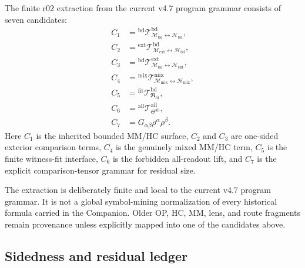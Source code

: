 \begin{definition}
\label{def:v470-r02-extracted-candidate-family}
The finite r02 extraction from the current v4.7 program grammar consists of
seven candidates:
\[
\begin{array}{ll}
C_1 &={}^{\mathrm{bd}}\mathcal T_{\mathcal M_{\mathrm{bd}}\leftrightarrow
\mathcal H_{\mathrm{bd}}}^{\mathrm{bd}},\\[2pt]
C_2 &={}^{\mathrm{ext}}\mathcal T_{\mathcal M_{\mathrm{ext}}\leftrightarrow
\mathcal H_{\mathrm{bd}}}^{\mathrm{bd}},\\[2pt]
C_3 &={}^{\mathrm{bd}}\mathcal T_{\mathcal M_{\mathrm{bd}}\leftrightarrow
\mathcal H_{\mathrm{ext}}}^{\mathrm{ext}},\\[2pt]
C_4 &={}^{\mathrm{mix}}\mathcal T_{\mathcal M_{\mathrm{mix}}\leftrightarrow
\mathcal H_{\mathrm{mix}}}^{\mathrm{mix}},\\[2pt]
C_5 &={}^{\mathrm{fit}}\mathcal T_{\mathfrak R_{\mathrm{fit}}}^{\mathrm{bd}},\\[2pt]
C_6 &={}^{\mathrm{all}}\mathcal T_{\Theta^{\mathrm{all}}}^{\mathrm{all}},\\[2pt]
C_7 &=G_{\alpha\beta}\rho^{\alpha}\rho^{\beta}.
\end{array}
\]
Here \(C_1\) is the inherited bounded MM/HC surface, \(C_2\) and \(C_3\) are
one-sided exterior comparison terms, \(C_4\) is the genuinely mixed MM/HC term,
\(C_5\) is the finite witness-fit interface, \(C_6\) is the forbidden
all-readout lift, and \(C_7\) is the explicit comparison-tensor grammar for
residual size.
\end{definition}

\begin{remark}
\label{rem:v470-r02-extraction-scope}
The extraction is deliberately finite and local to the current v4.7 program
grammar.  It is not a global symbol-mining normalization of every historical
formula carried in the Companion.  Older OP, HC, MM, lens, and route fragments
remain provenance unless explicitly mapped into one of the candidates above.
\end{remark}

\subsection{Sidedness and residual ledger}
\label{subsec:v470-r02-sidedness-residual-ledger}

